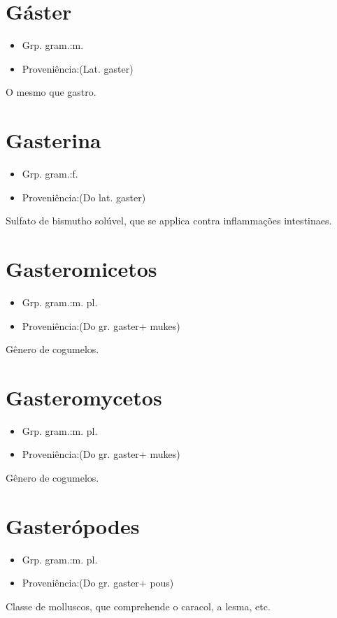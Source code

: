 \section{Gáster}
\begin{itemize}
\item {Grp. gram.:m.}
\end{itemize}
\begin{itemize}
\item {Proveniência:(Lat. \textunderscore gaster\textunderscore )}
\end{itemize}
O mesmo que \textunderscore gastro\textunderscore .
\section{Gasterina}
\begin{itemize}
\item {Grp. gram.:f.}
\end{itemize}
\begin{itemize}
\item {Proveniência:(Do lat. \textunderscore gaster\textunderscore )}
\end{itemize}
Sulfato de bismutho solúvel, que se applica contra inflammações intestinaes.
\section{Gasteromicetos}
\begin{itemize}
\item {Grp. gram.:m. pl.}
\end{itemize}
\begin{itemize}
\item {Proveniência:(Do gr. \textunderscore gaster\textunderscore  + \textunderscore mukes\textunderscore )}
\end{itemize}
Gênero de cogumelos.
\section{Gasteromycetos}
\begin{itemize}
\item {Grp. gram.:m. pl.}
\end{itemize}
\begin{itemize}
\item {Proveniência:(Do gr. \textunderscore gaster\textunderscore  + \textunderscore mukes\textunderscore )}
\end{itemize}
Gênero de cogumelos.
\section{Gasterópodes}
\begin{itemize}
\item {Grp. gram.:m. pl.}
\end{itemize}
\begin{itemize}
\item {Proveniência:(Do gr. \textunderscore gaster\textunderscore  + \textunderscore pous\textunderscore )}
\end{itemize}
Classe de molluscos, que comprehende o caracol, a lesma, etc.
